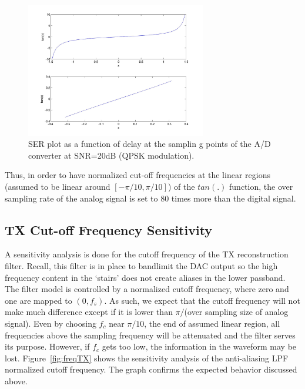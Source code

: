 \documentclass[]{article}
\begin{document}
\begin{figure}[H]
\centering
\includegraphics[width=0.7\textwidth]{tan_graph.jpg}
\caption{SER plot as a function of delay at the samplin g points of the A/D converter at SNR=20dB (QPSK modulation). \label{fig:delay}}
\end{figure} 

Thus, in order to have normalized cut-off frequencies at the linear regions (assumed to be linear around $\left[ -\pi/10,\pi/10 \right] $) of the $tan(.)$ function, the over sampling rate of the analog signal is set to 80 times more than the digital signal. \\

\subsection{TX Cut-off Frequency Sensitivity}
\label{sec:TXcutoff}
A sensitivity analysis is done for the cutoff frequency of the TX reconstruction filter. Recall, this filter is in place to bandlimit the DAC output so the high frequency content in the `stairs' does not create aliases in the lower passband. The filter model is controlled by a normalized cutoff frequency, where zero and one are mapped to $\left(0,f_s\right)$.  As such, we expect that the cutoff frequency will not make much difference except if it is lower than $\pi/$(over sampling size of analog signal).  Even by choosing $f_c$ near $\pi/10$, the end of assumed linear region, all frequencies above the sampling frequency will be attenuated and the filter serves its purpose.  However, if $f_c$ gets too low, the information in the waveform may be lost. Figure~\ref{fig:freqTX} shows the sensitivity analysis of the anti-aliasing LPF normalized cutoff frequency. The graph confirms the expected behavior discussed above.
\end{document}

